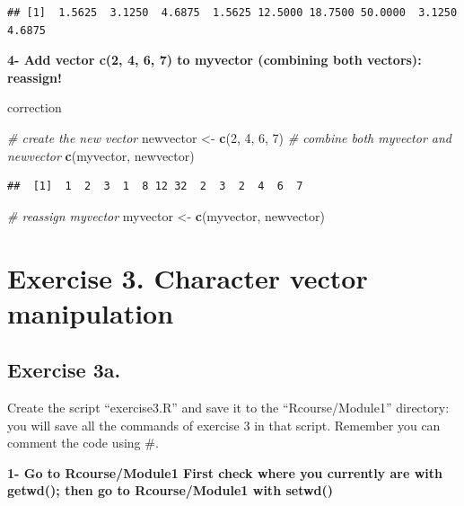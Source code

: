 \documentclass[]{book}
\newenvironment{Shaded}{\begin{snugshade}}{\end{snugshade}}
\newcommand{\CommentTok}[1]{\textcolor[rgb]{0.56,0.35,0.01}{\textit{#1}}}
\newcommand{\DecValTok}[1]{\textcolor[rgb]{0.00,0.00,0.81}{#1}}
\newcommand{\KeywordTok}[1]{\textcolor[rgb]{0.13,0.29,0.53}{\textbf{#1}}}
\newcommand{\NormalTok}[1]{#1}
\newcommand{\StringTok}[1]{\textcolor[rgb]{0.31,0.60,0.02}{#1}}
\begin{document}
\begin{verbatim}
## [1]  1.5625  3.1250  4.6875  1.5625 12.5000 18.7500 50.0000  3.1250  4.6875
\end{verbatim}

\textbf{4- Add vector c(2, 4, 6, 7) to myvector (combining both vectors): reassign!}

correction

\begin{Shaded}
\begin{Highlighting}[]
\CommentTok{# create the new vector}
\NormalTok{newvector <-}\StringTok{ }\KeywordTok{c}\NormalTok{(}\DecValTok{2}\NormalTok{, }\DecValTok{4}\NormalTok{, }\DecValTok{6}\NormalTok{, }\DecValTok{7}\NormalTok{)}
\CommentTok{# combine both myvector and newvector}
\KeywordTok{c}\NormalTok{(myvector, newvector)}
\end{Highlighting}
\end{Shaded}

\begin{verbatim}
##  [1]  1  2  3  1  8 12 32  2  3  2  4  6  7
\end{verbatim}

\begin{Shaded}
\begin{Highlighting}[]
\CommentTok{# reassign myvector}
\NormalTok{myvector <-}\StringTok{ }\KeywordTok{c}\NormalTok{(myvector, newvector)}
\end{Highlighting}
\end{Shaded}

\hypertarget{exercise-3.-character-vector-manipulation}{%
\section{Exercise 3. Character vector manipulation}\label{exercise-3.-character-vector-manipulation}}

\hypertarget{exercise-3a.}{%
\subsection{Exercise 3a.}\label{exercise-3a.}}

Create the script ``exercise3.R'' and save it to the ``Rcourse/Module1'' directory: you will save all the commands of exercise 3 in that script.
Remember you can comment the code using \#.

\textbf{1- Go to Rcourse/Module1
First check where you currently are with getwd();
then go to Rcourse/Module1 with setwd()}
\end{document}

